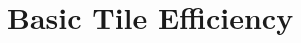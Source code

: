\documentclass{book}
\begin{document}

\part{Basic Tile Efficiency} \label{part:tile}


%
%
%
%
%
%
%
%
%
%
%
%
%
%
%
%
%
\end{document}
